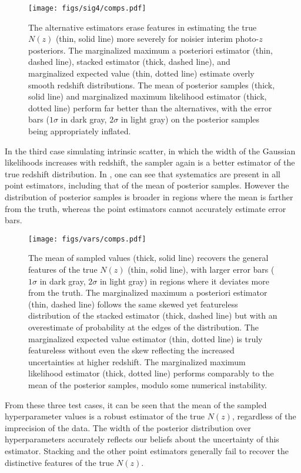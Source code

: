 \begin{figure}
	\texttt{[image: figs/sig4/comps.pdf]}
	\caption{The alternative estimators erase features in estimating the true $N(z)$ (thin, solid line) more severely for noisier interim photo-$z$ posteriors.  
		The marginalized maximum a posteriori estimator (thin, dashed line), stacked estimator (thick, dashed line), and marginalized expected value (thin, dotted line) estimate overly smooth redshift distributions.  
		The mean of posterior samples (thick, solid line) and marginalized maximum likelihood estimator (thick, dotted line) perform far better than the alternatives, with the error bars ($1\sigma$ in dark gray, $2\sigma$ in light gray) on the posterior samples being appropriately inflated.}
\end{figure}

In the third case simulating intrinsic scatter, in which the width of the Gaussian likelihoods increases with redshift, the sampler again is a better estimator of the true redshift distribution.  
In , one can see that systematics are present in all point estimators, including that of the mean of posterior samples.  
However the distribution of posterior samples is broader in regions where the mean is farther from the truth, whereas the point estimators cannot accurately estimate error bars.

\begin{figure}
	\texttt{[image: figs/vars/comps.pdf]}
	\caption{The mean of sampled values (thick, solid line) recovers the general features of the true $N(z)$ (thin, solid line), with larger error bars ($1\sigma$ in dark gray, $2\sigma$ in light gray) in regions where it deviates more from the truth.  
		The marginalized maximum a posteriori estimator (thin, dashed line) follows the same skewed yet featureless distribution of the stacked estimator (thick, dashed line) but with an overestimate of probability at the edges of the distribution.  
		The marginalized expected value estimator (thin, dotted line) is truly featureless without even the skew reflecting the increased uncertainties at higher redshift.  
		The marginalized maximum likelihood estimator (thick, dotted line) performs comparably to the mean of the posterior samples, modulo some numerical instability.}
\end{figure}

From these three test cases, it can be seen that the mean of the sampled hyperparameter values is a robust estimator of the true $N(z)$, regardless of the imprecision of the data.  
The width of the posterior distribution over hyperparameters accurately reflects our beliefs about the uncertainty of this estimator.  
Stacking and the other point estimators generally fail to recover the distinctive features of the true $N(z)$.

